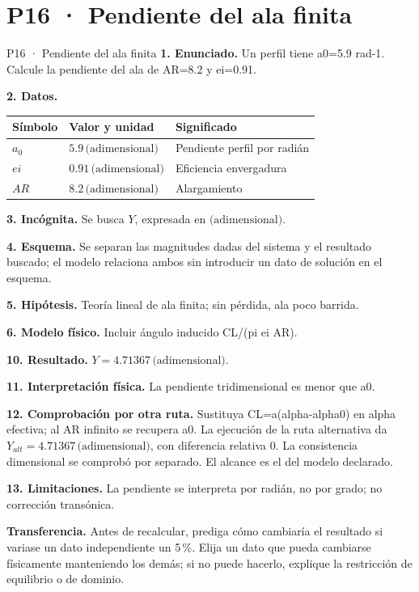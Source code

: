 \chapter*{P16 · Pendiente del ala finita}
\begin{studiumworked}{P16 · Pendiente del ala finita}
\textbf{1. Enunciado.} Un perfil tiene a0=5.9 rad-1. Calcule la pendiente del ala de AR=8.2 y ei=0.91.

\textbf{2. Datos.}
\begin{longtable}{p{.16\linewidth}p{.35\linewidth}p{.38\linewidth}}\toprule Símbolo & Valor y unidad & Significado\\\midrule\endhead
$a_{0}$ & $5.9\,\text{(adimensional)}$ & Pendiente perfil por radián\\
$ei$ & $0.91\,\text{(adimensional)}$ & Eficiencia envergadura\\
$AR$ & $8.2\,\text{(adimensional)}$ & Alargamiento\\
\bottomrule\end{longtable}
\textbf{3. Incógnita.} Se busca $Y$, expresada en $\text{(adimensional)}$.

\textbf{4. Esquema.} Se separan las magnitudes dadas del sistema y el resultado buscado; el modelo relaciona ambos sin introducir un dato de solución en el esquema.

\textbf{5. Hipótesis.} Teoría lineal de ala finita; sin pérdida, ala poco barrida.

\textbf{6. Modelo físico.} Incluir ángulo inducido CL/(pi ei AR).


\textbf{10. Resultado.} $Y=4.71367\,\text{(adimensional)}$.

\textbf{11. Interpretación física.} La pendiente tridimensional es menor que a0.

\textbf{12. Comprobación por otra ruta.} Sustituya CL=a(alpha-alpha0) en alpha efectiva; al AR infinito se recupera a0. La ejecución de la ruta alternativa da $Y_{alt}=4.71367\,\text{(adimensional)}$, con diferencia relativa $0$. La consistencia dimensional se comprobó por separado. El alcance es el del modelo declarado.

\textbf{13. Limitaciones.} La pendiente se interpreta por radián, no por grado; no corrección transónica.

\textbf{Transferencia.} Antes de recalcular, prediga cómo cambiaría el resultado si variase un dato independiente un 5\,\%. Elija un dato que pueda cambiarse físicamente manteniendo los demás; si no puede hacerlo, explique la restricción de equilibrio o de dominio.\par
\end{studiumworked}
